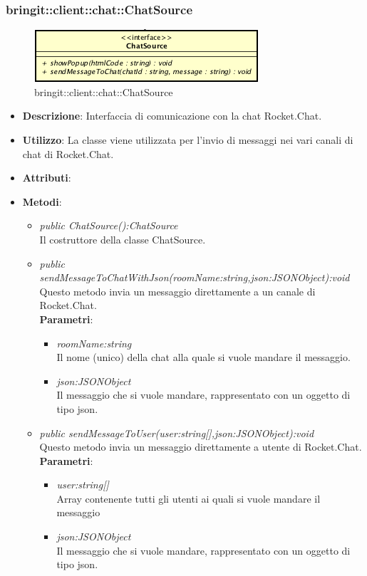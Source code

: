 \subsubsection{bringit::client::chat::ChatSource}

\label{bringit::client::chat::ChatSource}
\begin{figure}[H]
	\centering
	\includegraphics[scale=0.5]{Sezioni/SottosezioniST/img/app/ChatSource.png}
	\caption{bringit::client::chat::ChatSource}
\end{figure}

\begin{itemize}
\item \textbf{Descrizione}: Interfaccia di comunicazione con la chat Rocket.Chat.
\item \textbf{Utilizzo}: La classe viene utilizzata per l'invio di messaggi nei vari canali di chat di Rocket.Chat.
\item \textbf{Attributi}: 
\item \textbf{Metodi}:
	\begin{itemize}
	\item \textit{public ChatSource():ChatSource}\\
	Il costruttore della classe ChatSource.
	\item \textit{public sendMessageToChatWithJson(roomName:string,json:JSONObject):void}\\
	Questo metodo invia un messaggio direttamente a un canale di Rocket.Chat.
			\\ \textbf{Parametri}: \begin{itemize}
				\item \textit{roomName:string}\\
				Il nome (unico) della chat alla quale si vuole mandare il messaggio.
				\item \textit{json:JSONObject}\\
				Il messaggio che si vuole mandare, rappresentato con un oggetto di tipo json.
			\end{itemize}
	\item \textit{public sendMessageToUser(user:string[],json:JSONObject):void}\\
	Questo metodo invia un messaggio direttamente a utente di Rocket.Chat.
			\\ \textbf{Parametri}: \begin{itemize}
				\item \textit{user:string[]}\\
				Array contenente tutti gli utenti ai quali si vuole mandare il messaggio
				\item \textit{json:JSONObject}\\
				Il messaggio che si vuole mandare, rappresentato con un oggetto di tipo json.
			\end{itemize}
	\end{itemize}
\end{itemize} 

